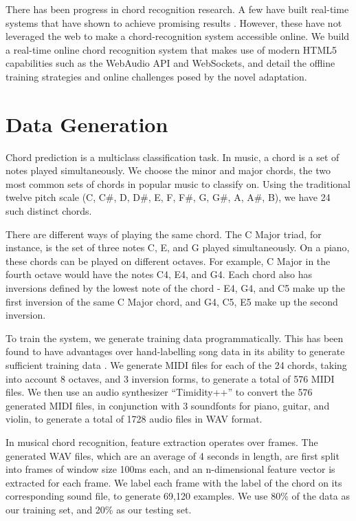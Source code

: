 \documentclass{article}
\begin{document}
There has been progress in chord recognition research. A few have built
real-time systems that have shown to achieve promising results \cite{fujishima,
cho}. However, these have not leveraged the web to make a chord-recognition
system accessible online. We build a real-time online chord recognition system
that makes use of modern HTML5 capabilities such as the WebAudio API and
WebSockets, and detail the offline training strategies and online challenges
posed by the novel adaptation.

\section{Data Generation}
Chord prediction is a multiclass classification task. In music, a chord
is a set of notes played simultaneously. We choose the minor and
major chords, the two most common sets of chords in popular music to classify
on. Using the traditional twelve pitch scale (C, C\#, D, D\#, E, F, F\#, G, G\#,
A, A\#, B), we have 24 such distinct chords.

There are different ways of playing the same chord. The C Major triad, for instance, is the set of three notes C, E, and G played simultaneously. On a piano, these chords can be played on different octaves. For example, C Major in the fourth octave would have the notes C4, E4, and G4. Each chord also has inversions defined by the lowest note of the chord - E4, G4, and C5 make up the first inversion of the same C Major chord, and G4, C5, E5 make up the second inversion.

To train the system, we generate training data programmatically. This has been found to have advantages over hand-labelling song data in its ability to generate sufficient training data \cite{lee}. We generate MIDI files for each of the 24 chords,
taking into account 8 octaves, and 3 inversion forms, to generate a total of 576
MIDI files. We then use an audio synthesizer ``Timidity++'' to convert the 576
generated MIDI files, in conjunction with 3 soundfonts for piano, guitar, and
violin, to generate a total of 1728 audio files in WAV format.

In musical chord recognition, feature extraction operates over frames. The
generated WAV files, which are an average of 4 seconds in length, are first
split into frames of window size 100ms each, and an n-dimensional feature vector
is extracted for each frame. We label each frame with the label of the chord on
its corresponding sound file, to generate 69,120 examples. We use 80\% of the
data as our training set, and 20\% as our testing set.
\end{document}
